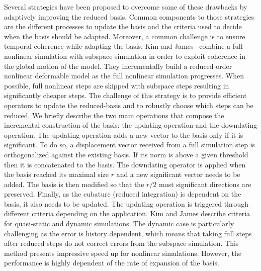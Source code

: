 Several strategies have been proposed to overcome some of these drawbacks by adaptively improving the reduced basis. Common components to those strategies are the different processes to update the basis and the criteria used to decide when the basis should be adapted. Moreover, a common challenge is to ensure temporal coherence while adapting the basis.
Kim and James~\cite{Kim2009Skipping} combine a full nonlinear simulation with subspace simulation in order to exploit coherence in the global motion of the model.
They incrementally build a reduced-order nonlinear deformable model as the full nonlinear simulation progresses. When possible, full nonlinear steps are skipped with subspace steps resulting in significantly cheaper steps. The challenge of this strategy is to provide efficient operators to update the reduced-basis and to robustly choose which steps can be reduced. We briefly describe the two main operations that compose the incremental construction of the basis: the updating operation and the downdating operation. The updating operation adds a new vector to the basis only if it is significant. To do so, a displacement vector received from a full simulation step is orthogonalized against the existing basis. If its norm is above a given threshold then it is concatenated to the basis. The downdating operator is applied when the basis reached its maximal size $r$ and a new significant vector needs to be added. The basis is then modified so that the $r/2$ most significant directions are preserved. Finally, as the cubature (reduced integration) is dependent on the basis, it also needs to be updated. The updating operation is triggered through different criteria depending on the application. Kim and James describe criteria for quasi-static and dynamic simulations. The dynamic case is particularly challenging as the error is history dependent, which means that taking full steps after reduced steps do not correct errors from the subspace simulation. This method presents impressive speed up for nonlinear simulations. However, the performance is highly dependent of the rate of expansion of the basis.

